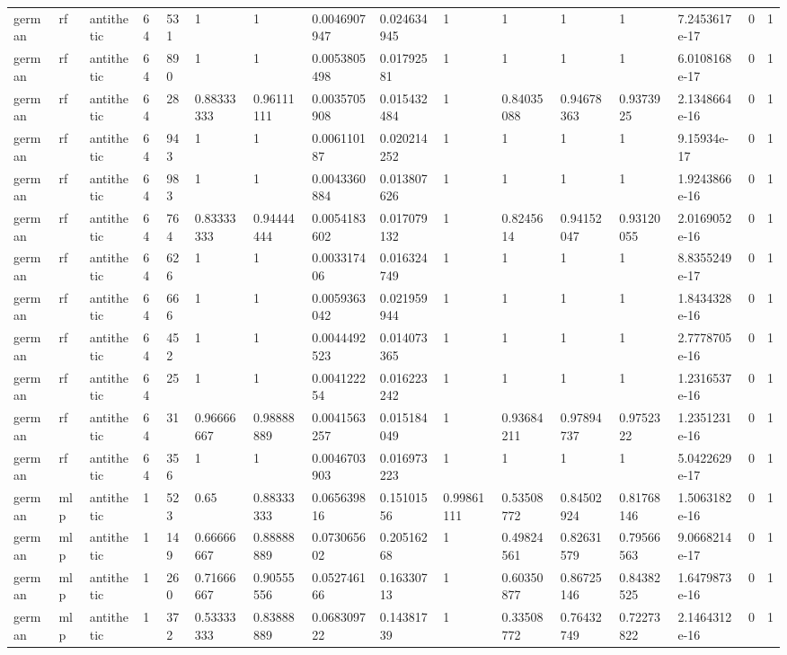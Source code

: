 \begin{tabular}{llllllllllllllll}
german & rf & antithetic & 64 & 531 & 1 & 1 & 0.0046907947 & 0.024634945 & 1 & 1 & 1 & 1 & 7.2453617e-17 & 0 & 1 \\
german & rf & antithetic & 64 & 890 & 1 & 1 & 0.0053805498 & 0.01792581 & 1 & 1 & 1 & 1 & 6.0108168e-17 & 0 & 1 \\
german & rf & antithetic & 64 & 28 & 0.88333333 & 0.96111111 & 0.0035705908 & 0.015432484 & 1 & 0.84035088 & 0.94678363 & 0.9373925 & 2.1348664e-16 & 0 & 1 \\
german & rf & antithetic & 64 & 943 & 1 & 1 & 0.006110187 & 0.020214252 & 1 & 1 & 1 & 1 & 9.15934e-17 & 0 & 1 \\
german & rf & antithetic & 64 & 983 & 1 & 1 & 0.0043360884 & 0.013807626 & 1 & 1 & 1 & 1 & 1.9243866e-16 & 0 & 1 \\
german & rf & antithetic & 64 & 764 & 0.83333333 & 0.94444444 & 0.0054183602 & 0.017079132 & 1 & 0.8245614 & 0.94152047 & 0.93120055 & 2.0169052e-16 & 0 & 1 \\
german & rf & antithetic & 64 & 626 & 1 & 1 & 0.003317406 & 0.016324749 & 1 & 1 & 1 & 1 & 8.8355249e-17 & 0 & 1 \\
german & rf & antithetic & 64 & 666 & 1 & 1 & 0.0059363042 & 0.021959944 & 1 & 1 & 1 & 1 & 1.8434328e-16 & 0 & 1 \\
german & rf & antithetic & 64 & 452 & 1 & 1 & 0.0044492523 & 0.014073365 & 1 & 1 & 1 & 1 & 2.7778705e-16 & 0 & 1 \\
german & rf & antithetic & 64 & 25 & 1 & 1 & 0.004122254 & 0.016223242 & 1 & 1 & 1 & 1 & 1.2316537e-16 & 0 & 1 \\
german & rf & antithetic & 64 & 31 & 0.96666667 & 0.98888889 & 0.0041563257 & 0.015184049 & 1 & 0.93684211 & 0.97894737 & 0.9752322 & 1.2351231e-16 & 0 & 1 \\
german & rf & antithetic & 64 & 356 & 1 & 1 & 0.0046703903 & 0.016973223 & 1 & 1 & 1 & 1 & 5.0422629e-17 & 0 & 1 \\
german & mlp & antithetic & 1 & 523 & 0.65 & 0.88333333 & 0.065639816 & 0.15101556 & 0.99861111 & 0.53508772 & 0.84502924 & 0.81768146 & 1.5063182e-16 & 0 & 1 \\
german & mlp & antithetic & 1 & 149 & 0.66666667 & 0.88888889 & 0.073065602 & 0.20516268 & 1 & 0.49824561 & 0.82631579 & 0.79566563 & 9.0668214e-17 & 0 & 1 \\
german & mlp & antithetic & 1 & 260 & 0.71666667 & 0.90555556 & 0.052746166 & 0.16330713 & 1 & 0.60350877 & 0.86725146 & 0.84382525 & 1.6479873e-16 & 0 & 1 \\
german & mlp & antithetic & 1 & 372 & 0.53333333 & 0.83888889 & 0.068309722 & 0.14381739 & 1 & 0.33508772 & 0.76432749 & 0.72273822 & 2.1464312e-16 & 0 & 1 \\

\end{tabular}
